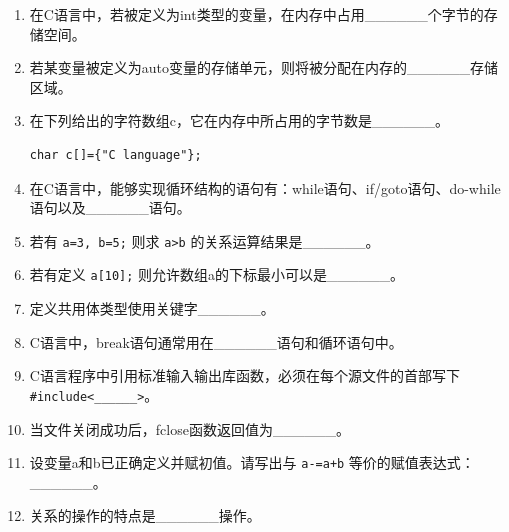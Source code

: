 \documentclass[a4paper,12pt]{article}
\begin{document}
\begin{enumerate}
	\item 在C语言中，若被定义为int类型的变量，在内存中占用\_\_\_\_\_\_个字节的存储空间。
	      \vspace{0.3cm}

	\item 若某变量被定义为auto变量的存储单元，则将被分配在内存的\_\_\_\_\_\_存储区域。
	      \vspace{0.3cm}

	\item 在下列给出的字符数组c，它在内存中所占用的字节数是\_\_\_\_\_\_。
	      \begin{verbatim}
char c[]={"C language"};
    \end{verbatim}
	      \vspace{0.3cm}

	\item 在C语言中，能够实现循环结构的语句有：while语句、if/goto语句、do-while语句以及\_\_\_\_\_\_语句。
	      \vspace{0.3cm}

	\item 若有 \texttt{a=3, b=5;} 则求 \texttt{a>b} 的关系运算结果是\_\_\_\_\_\_。
	      \vspace{0.3cm}

	\item 若有定义 \texttt{a[10];} 则允许数组a的下标最小可以是\_\_\_\_\_\_。
	      \vspace{0.3cm}

	\item 定义共用体类型使用关键字\_\_\_\_\_\_。
	      \vspace{0.3cm}

	\item C语言中，break语句通常用在\_\_\_\_\_\_语句和循环语句中。
	      \vspace{0.3cm}

	\item C语言程序中引用标准输入输出库函数，必须在每个源文件的首部写下 \texttt{\#include<\_\_\_\_\_\_>}。
	      \vspace{0.3cm}

	\item 当文件关闭成功后，fclose函数返回值为\_\_\_\_\_\_。
	      \vspace{0.3cm}

	\item 设变量a和b已正确定义并赋初值。请写出与 \texttt{a-=a+b} 等价的赋值表达式：\_\_\_\_\_\_。
	      \vspace{0.3cm}

	\item 关系的操作的特点是\_\_\_\_\_\_操作。
	      \vspace{0.3cm}


\end{enumerate}
\end{document}
